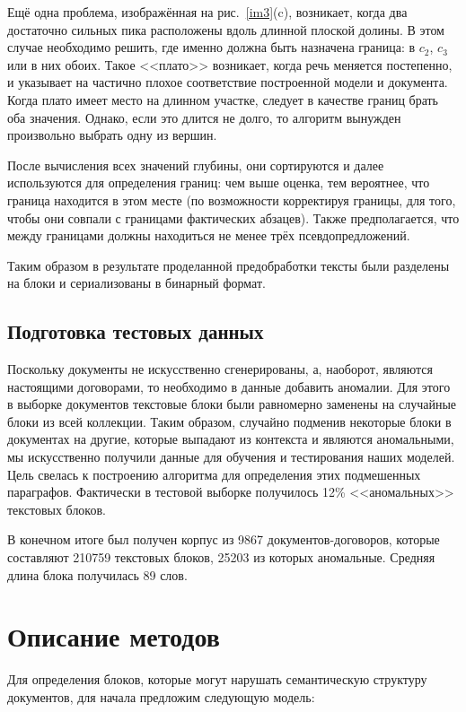 \documentclass[12pt]{article}
\begin{document}
\begin{enumerate}
{		Ещё одна проблема, изображённая на рис.~\ref{im3}(c), возникает, когда два достаточно сильных пика расположены вдоль длинной плоской долины. В этом случае необходимо решить, где именно должна быть назначена граница: в $c_2$, $c_3$ или в них обоих. Такое <<плато>> возникает, когда речь меняется постепенно, и указывает на частично плохое соответствие построенной модели и документа. Когда плато имеет место на длинном участке, следует в качестве границ брать оба значения. Однако, если это длится не долго, то алгоритм вынужден произвольно выбрать одну из вершин. 
		
		После вычисления всех значений глубины, они сортируются и далее используются для определения границ: чем выше оценка, тем вероятнее, что граница находится в этом месте (по возможности корректируя границы, для того, чтобы они совпали с границами фактических абзацев). Также предполагается, что между границами должны находиться не менее трёх псевдопредложений.
}\end{enumerate}


Таким образом в результате проделанной предобработки тексты были разделены на блоки и сериализованы в бинарный формат.

\subsection{Подготовка тестовых данных}
Поскольку документы не искусственно сгенерированы, а, наоборот, являются настоящими договорами, то необходимо в данные добавить аномалии. Для этого в выборке документов текстовые блоки были равномерно заменены на случайные блоки из всей коллекции. Таким образом, случайно подменив некоторые блоки в документах на другие, которые выпадают из контекста и являются аномальными, мы искусственно получили данные для обучения и тестирования наших моделей. Цель свелась к построению алгоритма для определения этих подмешенных параграфов. Фактически в тестовой выборке получилось  12\% <<аномальных>> текстовых блоков.

В конечном итоге был получен корпус из 9867 документов-\linebreak договоров, которые составляют 210759 текстовых блоков, 25203 из которых аномальные. Средняя длина блока получилась 89 слов.

\newpage
\section{Описание методов}
Для определения блоков, которые могут нарушать семантическую структуру документов, для начала предложим следующую модель:
\end{document}
